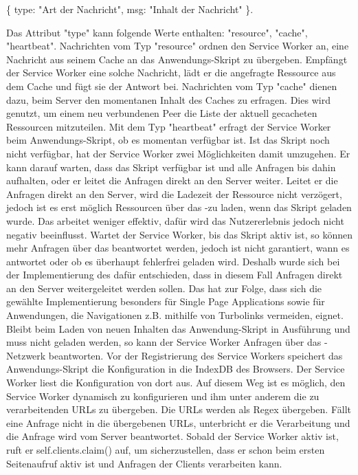 \{ type: "Art der Nachricht", msg: "Inhalt der Nachricht" \}. 

Das Attribut "type" kann folgende Werte enthalten: "resource", "cache", "heartbeat". Nachrichten vom Typ "resource" ordnen den Service Worker an, eine Nachricht aus seinem Cache an das Anwendungs-Skript zu übergeben. Empfängt der Service Worker eine solche Nachricht, lädt er die angefragte Ressource aus dem Cache und fügt sie der Antwort bei. Nachrichten vom Typ "cache" dienen dazu, beim Server den momentanen Inhalt des Caches zu erfragen. Dies wird genutzt, um einem neu verbundenen Peer die Liste der aktuell gecacheten Ressourcen mitzuteilen. Mit dem Typ "heartbeat" erfragt der Service Worker beim Anwendungs-Skript, ob es momentan verfügbar ist.
Ist das Skript noch nicht verfügbar, hat der Service Worker zwei Möglichkeiten damit umzugehen. Er kann darauf warten, dass das Skript verfügbar ist und alle Anfragen bis dahin aufhalten, oder er leitet die Anfragen direkt an den Server weiter. Leitet er die Anfragen direkt an den Server, wird die Ladezeit der Ressource nicht verzögert, jedoch ist es erst möglich Ressourcen über das \pTp-\cdn zu laden, wenn das Skript geladen wurde. Das \cdn arbeitet weniger effektiv, dafür wird das Nutzererlebnis jedoch nicht negativ beeinflusst. Wartet der Service Worker, bis das Skript aktiv ist, so können mehr Anfragen über das \cdn beantwortet werden, jedoch ist nicht garantiert, wann es antwortet oder ob es überhaupt fehlerfrei geladen wird. Deshalb wurde sich bei der Implementierung des \cdn dafür entschieden, dass in diesem Fall Anfragen direkt an den Server weitergeleitet werden sollen. Das hat zur Folge, dass sich die gewählte Implementierung besonders für Single Page Applications sowie für Anwendungen, die Navigationen z.B. mithilfe von Turbolinks vermeiden, eignet. Bleibt beim Laden von neuen Inhalten das Anwendung-Skript in Ausführung und muss nicht geladen werden, so kann der Service Worker Anfragen über das \pTp-Netzwerk beantworten.
 Vor der Registrierung des Service Workers speichert das Anwendungs-Skript die Konfiguration in die IndexDB des Browsers. Der Service Worker liest die Konfiguration von dort aus. Auf diesem Weg ist es möglich, den Service Worker dynamisch zu konfigurieren und ihm unter anderem die zu verarbeitenden URLs zu übergeben. Die URLs werden als Regex übergeben. Fällt eine Anfrage nicht in die übergebenen URLs, unterbricht er die Verarbeitung und die Anfrage wird vom Server beantwortet.
 Sobald der Service Worker aktiv ist, ruft er self.clients.claim() auf, um sicherzustellen, dass er schon beim ersten Seitenaufruf aktiv ist und Anfragen der Clients verarbeiten kann.
 

